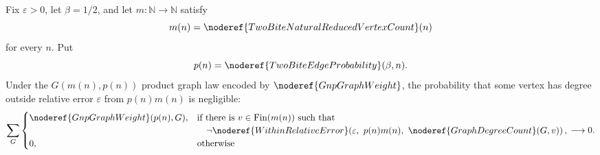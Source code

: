 \begin{helper}[GnpGraphWeightNaturalDegreeConcentration]
Fix \(\varepsilon>0\), let \(\beta=1/2\), and let
\(m:\mathbb N\to\mathbb N\) satisfy
\[
m(n)=\noderef{TwoBiteNaturalReducedVertexCount}(n)
\]
for every \(n\).  Put
\[
p(n)=\noderef{TwoBiteEdgeProbability}(\beta,n).
\]
Under the \(G(m(n),p(n))\) product graph law encoded by
\(\noderef{GnpGraphWeight}\), the probability that some vertex has degree
outside relative error \(\varepsilon\) from \(p(n)m(n)\) is negligible:
\[
\sum_G
\begin{cases}
\noderef{GnpGraphWeight}(p(n),G),
&\text{if there is }v\in\operatorname{Fin}(m(n))\text{ such that}\\
&\quad\neg\noderef{WithinRelativeError}
  \!\left(\varepsilon,\ p(n)m(n),\
    \noderef{GraphDegreeCount}(G,v)\right),\\
0,&\text{otherwise}
\end{cases}
\longrightarrow 0 .
\]
\end{helper}
